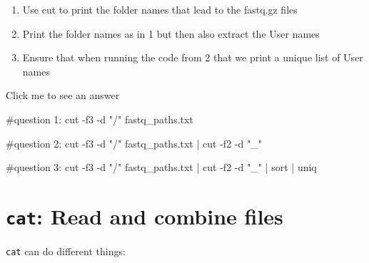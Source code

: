 \documentclass[
  letterpaper,
  DIV=11,
  numbers=noendperiod]{scrreprt}
\newenvironment{Shaded}{}{}
\newcommand{\AttributeTok}[1]{\textcolor[rgb]{0.84,0.23,0.29}{#1}}
\newcommand{\CommentTok}[1]{\textcolor[rgb]{0.42,0.45,0.49}{#1}}
\newcommand{\FunctionTok}[1]{\textcolor[rgb]{0.44,0.26,0.76}{#1}}
\newcommand{\KeywordTok}[1]{\textcolor[rgb]{0.84,0.23,0.29}{#1}}
\newcommand{\NormalTok}[1]{\textcolor[rgb]{0.14,0.16,0.18}{#1}}
\newcommand{\StringTok}[1]{\textcolor[rgb]{0.01,0.18,0.38}{#1}}
\providecommand{\tightlist}{%
  \setlength{\itemsep}{0pt}\setlength{\parskip}{0pt}}\usepackage{longtable,booktabs,array}
\begin{document}
\begin{tcolorbox}[enhanced jigsaw, bottomtitle=1mm, colframe=quarto-callout-caution-color-frame, left=2mm, leftrule=.75mm, coltitle=black, colbacktitle=quarto-callout-caution-color!10!white, toprule=.15mm, rightrule=.15mm, opacityback=0, titlerule=0mm, colback=white, breakable, bottomrule=.15mm, title=\textcolor{quarto-callout-caution-color}{\faFire}\hspace{0.5em}{Exercise}, arc=.35mm, toptitle=1mm, opacitybacktitle=0.6]

\begin{enumerate}
\def\labelenumi{\arabic{enumi}.}
\tightlist
\item
  Use cut to print the folder names that lead to the fastq.gz files
\item
  Print the folder names as in 1 but then also extract the User names
\item
  Ensure that when running the code from 2 that we print a unique list
  of User names
\end{enumerate}

Click me to see an answer

\begin{Shaded}
\begin{Highlighting}[]
\CommentTok{\#question 1:}
\FunctionTok{cut} \AttributeTok{{-}f3} \AttributeTok{{-}d} \StringTok{"/"}\NormalTok{ fastq\_paths.txt}

\CommentTok{\#question 2:}
\FunctionTok{cut} \AttributeTok{{-}f3} \AttributeTok{{-}d} \StringTok{"/"}\NormalTok{ fastq\_paths.txt }\KeywordTok{|} \FunctionTok{cut} \AttributeTok{{-}f2} \AttributeTok{{-}d} \StringTok{"\_"}

\CommentTok{\#question 3:}
\FunctionTok{cut} \AttributeTok{{-}f3} \AttributeTok{{-}d} \StringTok{"/"}\NormalTok{ fastq\_paths.txt }\KeywordTok{|} \FunctionTok{cut} \AttributeTok{{-}f2} \AttributeTok{{-}d} \StringTok{"\_"} \KeywordTok{|} \FunctionTok{sort} \KeywordTok{|} \FunctionTok{uniq}
\end{Highlighting}
\end{Shaded}

\end{tcolorbox}

\section{\texorpdfstring{\texttt{cat}: Read and combine
files}{cat: Read and combine files}}\label{cat-read-and-combine-files}

\texttt{cat} can do different things:
\end{document}
